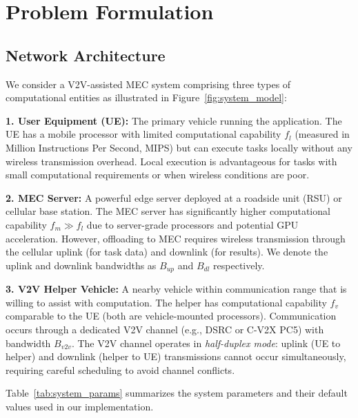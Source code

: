 \documentclass[journal,twoside]{IEEEtran}
\begin{document}
    \section{Problem Formulation}
    \label{sec:problem}

\subsection{Network Architecture}

We consider a V2V-assisted MEC system comprising three types of computational entities as illustrated in Figure~\ref{fig:system_model}:

\textbf{1. User Equipment (UE):} The primary vehicle running the application. The UE has a mobile processor with limited computational capability $f_l$ (measured in Million Instructions Per Second, MIPS) but can execute tasks locally without any wireless transmission overhead. Local execution is advantageous for tasks with small computational requirements or when wireless conditions are poor.

\textbf{2. MEC Server:} A powerful edge server deployed at a roadside unit (RSU) or cellular base station. The MEC server has significantly higher computational capability $f_m \gg f_l$ due to server-grade processors and potential GPU acceleration. However, offloading to MEC requires wireless transmission through the cellular uplink (for task data) and downlink (for results). We denote the uplink and downlink bandwidths as $B_{up}$ and $B_{dl}$ respectively.

\textbf{3. V2V Helper Vehicle:} A nearby vehicle within communication range that is willing to assist with computation. The helper has computational capability $f_v$ comparable to the UE (both are vehicle-mounted processors). Communication occurs through a dedicated V2V channel (e.g., DSRC or C-V2X PC5) with bandwidth $B_{v2v}$. The V2V channel operates in \textit{half-duplex mode}: uplink (UE to helper) and downlink (helper to UE) transmissions cannot occur simultaneously, requiring careful scheduling to avoid channel conflicts.

Table~\ref{tab:system_params} summarizes the system parameters and their default values used in our implementation.
\end{document}
